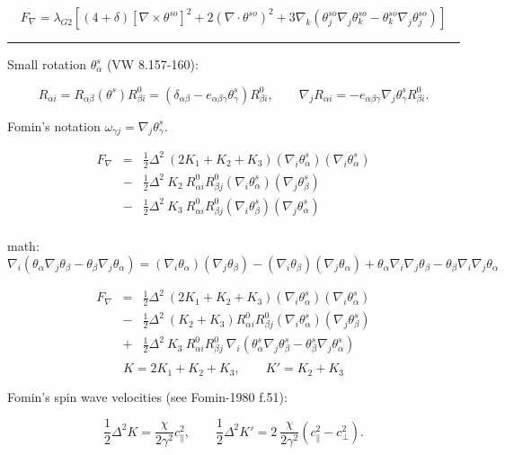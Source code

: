 \documentclass[a4paper]{article}
\begin{document}
$$
F_\nabla = \lambda_{G2} \left[
   (4+\delta) [\nabla \times \theta^{so}]^2
  + 2 (\nabla \cdot \theta^{so})^2
  + 3 \nabla_k(\theta^{so}_j \nabla_j\theta^{so}_k - \theta^{so}_k \nabla_j\theta^{so}_j)
\right]
$$

\eject
\hrule
\medskip

Small rotation $\theta^s_\alpha$ (VW 8.157-160):

$$
R_{\alpha i} = R_{\alpha\beta}(\theta^s) R^0_{\beta i} =
(\delta_{\alpha\beta} - e_{\alpha\beta \gamma}\theta^s_\gamma) R^0_{\beta i},
\qquad
\nabla_j R_{\alpha i} = 
- e_{\alpha\beta \gamma}\nabla_j \theta^s_\gamma R^0_{\beta i}.
$$

Fomin's notation $\omega_{\gamma j} = \nabla_j \theta^s_\gamma$.

\begin{eqnarray*}
F_\nabla
&=& \frac12 \Delta^2\ (2 K_1 + K_2 + K_3)
(\nabla_i\theta^s_\alpha) (\nabla_i\theta^s_\alpha)\\
&-& \frac12 \Delta^2\  K_2
\ R^0_{\alpha i}R^0_{\beta j}(\nabla_i\theta^s_\alpha)(\nabla_j\theta^s_\beta)\\
&-& \frac12 \Delta^2\ K_3
\ R^0_{\alpha i}R^0_{\beta j}(\nabla_i\theta^s_\beta) (\nabla_j\theta^s_\alpha)\\
\end{eqnarray*}

math:
$$
\nabla_i(\theta_\alpha \nabla_j\theta_\beta - \theta_\beta \nabla_j\theta_\alpha) =
(\nabla_i\theta_\alpha)(\nabla_j\theta_\beta) -(\nabla_i\theta_\beta) (\nabla_j\theta_\alpha)
+ \theta_\alpha \nabla_i\nabla_j\theta_\beta - \theta_\beta \nabla_i\nabla_j\theta_\alpha
$$

\begin{eqnarray*}
F_\nabla
&=& \frac12 \Delta^2\ (2 K_1 + K_2 + K_3)
(\nabla_i\theta^s_\alpha) (\nabla_i\theta^s_\alpha)\\
&-& \frac12 \Delta^2\ (K_2+K_3)
R^0_{\alpha i}R^0_{\beta j}(\nabla_i\theta^s_\alpha)(\nabla_j\theta^s_\beta)\\
&+& \frac12 \Delta^2\ K_3
\ R^0_{\alpha i}R^0_{\beta j}
\ \nabla_i(\theta^s_\alpha \nabla_j\theta^s_\beta - \theta^s_\beta \nabla_j\theta^s_\alpha)\\
\end{eqnarray*}
$$
K=2K_1+K_2+K_3,\qquad K'=K_2+K_3
$$

Fomin's spin wave velocities (see Fomin-1980 f.51):

$$
\frac12\Delta^2 K  = \frac{\chi}{2\gamma^2} c_\parallel^2,\qquad
\frac12\Delta^2 K' = 2\ \frac{\chi}{2\gamma^2} (c_\parallel^2 - c_\perp^2).
$$
\end{document}
